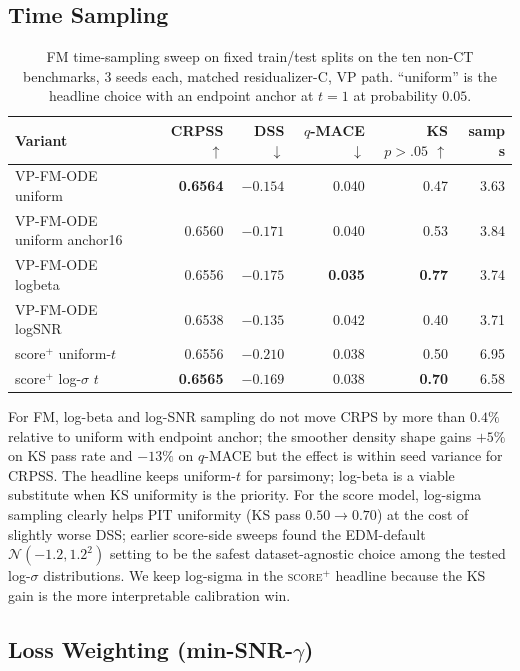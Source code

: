 \documentclass{article}
\newcommand{\Norm}{\mathcal{N}}
\begin{document}
\subsection{Time Sampling}\label{app:t-sampling}

\begin{table}[!h]
  \centering
  \caption{FM time-sampling sweep on fixed train/test splits on the ten non-CT benchmarks, 3 seeds each, matched residualizer-C, VP path. ``uniform'' is the headline choice with an endpoint anchor at $t=1$ at probability $0.05$.}\label{tab:t-sampling}
  \footnotesize
  \begin{tabular}{lrrrrr}
    \toprule
    Variant & CRPSS $\uparrow$ & DSS $\downarrow$ & $q$-MACE $\downarrow$ & KS $p{>}.05$ $\uparrow$ & samp s \\
    \midrule
    VP-FM-ODE uniform           & \textbf{0.6564} & $-0.154$ & 0.040 & 0.47 & 3.63 \\
    VP-FM-ODE uniform anchor16  & 0.6560 & \textbf{$-0.171$} & 0.040 & 0.53 & 3.84 \\
    VP-FM-ODE logbeta           & 0.6556 & $-0.175$ & \textbf{0.035} & \textbf{0.77} & 3.74 \\
    VP-FM-ODE logSNR            & 0.6538 & $-0.135$ & 0.042 & 0.40 & 3.71 \\
    \midrule
    score$^+$ uniform-$t$       & 0.6556 & \textbf{$-0.210$} & 0.038 & 0.50 & 6.95 \\
    score$^+$ log-$\sigma$ $t$  & \textbf{0.6565} & $-0.169$ & 0.038 & \textbf{0.70} & 6.58 \\
    \bottomrule
  \end{tabular}
\end{table}

For FM, log-beta and log-SNR sampling do not move CRPS by more than $0.4\%$ relative to uniform with endpoint anchor; the smoother density shape gains $+5\%$ on KS pass rate and $-13\%$ on $q$-MACE but the effect is within seed variance for CRPSS. The headline keeps uniform-$t$ for parsimony; log-beta is a viable substitute when KS uniformity is the priority. For the score model, log-sigma sampling clearly helps PIT uniformity (KS pass $0.50 \to 0.70$) at the cost of slightly worse DSS; earlier score-side sweeps found the EDM-default $\Norm(-1.2,1.2^2)$ setting to be the safest dataset-agnostic choice among the tested log-$\sigma$ distributions. We keep log-sigma in the \textsc{score$^+$} headline because the KS gain is the more interpretable calibration win.

\subsection{\texorpdfstring{Loss Weighting (min-SNR-$\gamma$)}{Loss Weighting (min-SNR-gamma)}}\label{app:loss-weighting}
\end{document}
